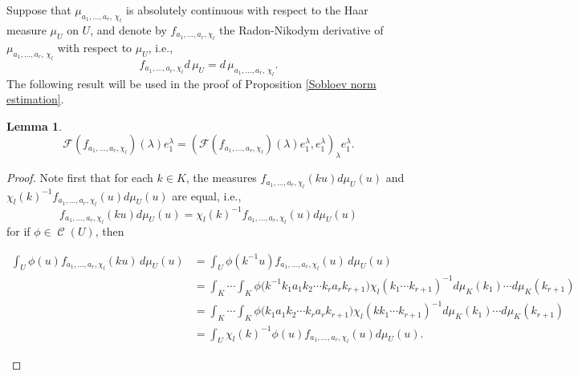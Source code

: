 \documentclass[11pt,a4paper]{amsart}
\DeclareMathOperator{\C}{\mathcal{C}}
\newtheorem{lemma}[theorem]{Lemma}
\theoremstyle{definition}
\numberwithin{equation}{section}
\begin{document}
Suppose that $\mu_{a_1,\dots ,a_r, \, \chi_l}$ is absolutely continuous with respect to the Haar measure $\mu_U$ on $U$, and denote by $f_{a_1,\dots ,a_r,\chi_l}$  the Radon-Nikodym derivative of  $\mu_{a_1,\dots ,a_r, \, \chi_l}$   with respect to $\mu_U$, i.e., $$ f_{a_1,\dots ,a_r,\chi_l} d\,\mu_U=d\,\mu_{ a_1,\dots ,a_r, \, \chi_l}.
$$
{   The following result will be used in the proof of Proposition \ref{Sobloev norm estimation}.}
\begin{lemma}\label{fouriour1 }
	$$
	\mathcal{F}\left(  f_{a_{1},...,a_{r},\chi_l}\right)(\lambda)e_1^\lambda = \left(  \mathcal{F}\left(  f_{a_{1},...,a_{r},\chi_l}\right)(\lambda)e_1^\lambda,e_1^\lambda \right)_\lambda e_1^\lambda.
	$$
\end{lemma}
\begin{proof}
	Note first that for each $k \in K$, the measures $f_{a_1,\dots ,a_r,\chi_l}\left(ku \right)d\mu_U\left( u\right)  $ and \\  $ \chi_l(k)^{-1} f_{a_1,\dots ,a_r,\chi_l}\left(u \right)d\mu_U\left( u\right)  $ are equal, i.e.,
	\begin{equation}\label{mesure-k-invariant}
	f_{a_1,\dots ,a_r,\chi_l}\left(ku \right)d\mu_U\left( u\right)  =  \chi_l(k)^{-1}  f_{a_1,\dots ,a_r,\chi_l}\left(u \right)d\mu_U\left( u\right) 
	\end{equation}
	for if $\phi \in \C\left(U \right) $, then 
 	\begin{scriptsize}
 	\begin{align*}
	\int_U\phi\left(u \right) f_{a_1,\dots ,a_r,\chi_l}\left(ku \right)\,d\mu_U\left( u\right)&= \int_U\phi\left(k^{-1}u \right) f_{a_1,\dots ,a_r,\chi_l}\left(u \right)\, d\mu_U\left( u\right)\\
	&=\int_K \cdots\int_K \phi\big(k^{-1}k_1a_1k_2\cdots k_ra_rk_{r+1}\big)\chi_l \left(k_1\cdots k_{r+1} \right)^{-1}d\mu_K(k_1) \cdots d\mu_K(k_{r+1})\\
	&=\int_K \cdots\int_K \phi\big(k_1a_1k_2\cdots k_ra_rk_{r+1}\big)\chi_l\left( k k_1\cdots k_{r+1} \right)^{-1}d\mu_K(k_1) \cdots d\mu_K(k_{r+1})\\
	&=  \int_U  \chi_l(k)^{-1} \phi\left(u \right) f_{a_1,\dots ,a_r,\chi_l}\left(u \right)d\mu_U\left( u\right).
	\end{align*}
 	\end{scriptsize}
 	

\end{proof}
\end{document}
